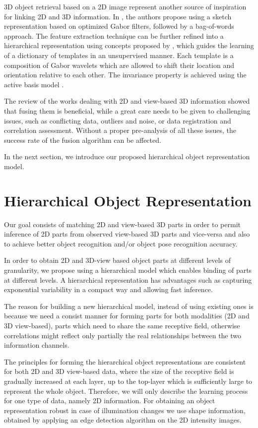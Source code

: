 \documentclass[runningheads]{llncs}
\begin{document}
3D object retrieval based on a 2D image represent another source of inspiration for linking 2D and 3D information. In \cite{Eitz2012}, the authors propose using a sketch representation based on optimized Gabor filters, followed by a bag-of-words approach. The feature extraction technique can be further refined into a hierarchical representation using concepts proposed by \cite{Dai2014}, which guides the learning of a dictionary of templates in an unsupervised manner. Each template is a composition of Gabor wavelets which are allowed to shift their location and orientation relative to each other. The invariance property is achieved using the active basis model \cite{Wu2010}.

The review of the works dealing with 2D and view-based 3D information showed that fusing them is beneficial, while a great care needs to be given to challenging issues, such as conflicting data, outliers and noise, or data registration and correlation assessment. Without a proper pre-analysis of all these issues, the success rate of the fusion algorithm can be affected. 

In the next section, we introduce our proposed hierarchical object representation model.  

\section{Hierarchical Object Representation} 
\label{sec:learning}    

Our goal consists of matching 2D and view-based 3D parts in order to permit inference of 2D parts from observed view-based 3D parts and vice-versa and also to achieve better object recognition and/or object pose recognition accuracy.  

In order to obtain 2D and 3D-view based object parts at different levels of granularity, we propose using a hierarchical model which enables binding of parts at different levels. A hierarchical representation has advantages such as capturing exponential variability in a compact way and allowing fast inference.

The reason for building a new hierarchical model, instead of using existing ones is because we need a consist manner for forming parts for both modalities (2D and 3D view-based), parts which need to share the same receptive field, otherwise correlations might reflect only partially the real relationships between the two information channels.

The principles for forming the hierarchical object representations are consistent for both 2D and 3D view-based data, where the size of the receptive field is gradually increased at each layer, up to the top-layer which is sufficiently large to represent the whole object. Therefore, we will only describe the learning process for one type of data, namely 2D information. For obtaining an object representation robust in case of illumination changes we use shape information, obtained by applying an edge detection algorithm on the 2D intensity images.
\end{document}
